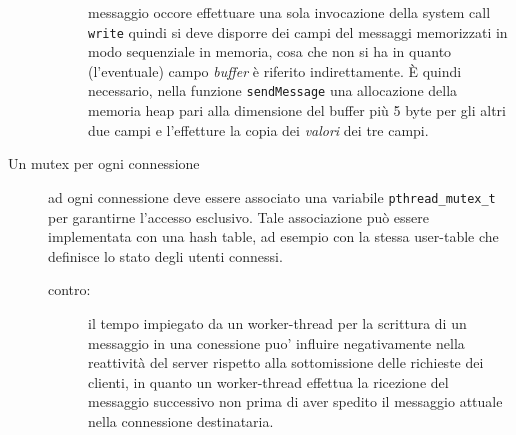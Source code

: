 \documentclass[a4paper,10pt]{article}
\begin{document}
\begin{description}
\begin{description}
      messaggio occore effettuare una sola invocazione della system
      call \texttt{write} quindi si deve disporre dei campi del
      messaggi memorizzati in modo sequenziale in memoria, cosa che
      non si ha in quanto (l'eventuale) campo \emph{buffer} \`e
      riferito indirettamente. \`E quindi necessario, nella funzione
      \texttt{sendMes\-sage} una allocazione della memoria heap pari
      alla dimensione del buffer pi\`u 5 byte per gli altri due campi
      e l'effetture la copia dei \emph{valori} dei tre campi.
  \end{description}
\item[Un mutex per ogni connessione] ad ogni connessione deve essere
  associato una variabile \verb+pthread_mutex_t+ per garantirne
  l'accesso esclusivo. Tale associazione pu\`o essere implementata con
  una hash table, ad esempio con la stessa user-table che definisce lo
  stato degli utenti connessi.
  \begin{description}
  \item[contro:] il tempo impiegato da un worker-thread per la
    scrittura di un messaggio in una conessione puo' influire
    negativamente nella reattivit\`a del server rispetto alla
    sottomissione delle richieste dei clienti, in quanto un
    worker-thread effettua la ricezione del messaggio successivo non
    prima di aver spedito il messaggio attuale nella connessione
    destinataria.
  \end{description}
\end{description}
\end{document}

